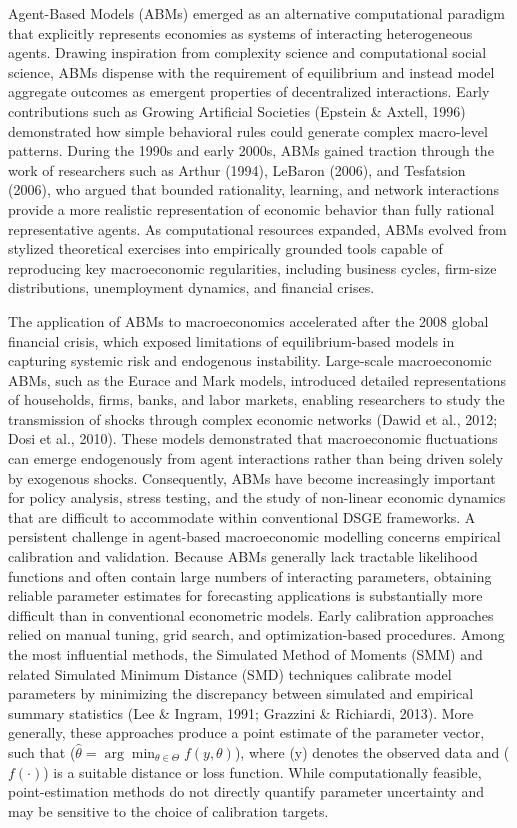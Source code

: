 \documentclass[12pt]{article}
\begin{document}
Agent-Based Models (ABMs) emerged as an alternative computational paradigm that explicitly represents economies as systems of interacting heterogeneous agents. Drawing inspiration from complexity science and computational social science, ABMs dispense with the requirement of equilibrium and instead model aggregate outcomes as emergent properties of decentralized interactions. Early contributions such as Growing Artificial Societies (Epstein \& Axtell, 1996) demonstrated how simple behavioral rules could generate complex macro-level patterns. During the 1990s and early 2000s, ABMs gained traction through the work of researchers such as Arthur (1994), LeBaron (2006), and Tesfatsion (2006), who argued that bounded rationality, learning, and network interactions provide a more realistic representation of economic behavior than fully rational representative agents. As computational resources expanded, ABMs evolved from stylized theoretical exercises into empirically grounded tools capable of reproducing key macroeconomic regularities, including business cycles, firm-size distributions, unemployment dynamics, and financial crises.

The application of ABMs to macroeconomics accelerated after the 2008 global financial crisis, which exposed limitations of equilibrium-based models in capturing systemic risk and endogenous instability. Large-scale macroeconomic ABMs, such as the Eurace and Mark models, introduced detailed representations of households, firms, banks, and labor markets, enabling researchers to study the transmission of shocks through complex economic networks (Dawid et al., 2012; Dosi et al., 2010). These models demonstrated that macroeconomic fluctuations can emerge endogenously from agent interactions rather than being driven solely by exogenous shocks. Consequently, ABMs have become increasingly important for policy analysis, stress testing, and the study of non-linear economic dynamics that are difficult to accommodate within conventional DSGE frameworks.
A persistent challenge in agent-based macroeconomic modelling concerns empirical calibration and validation. Because ABMs generally lack tractable likelihood functions and often contain large numbers of interacting parameters, obtaining reliable parameter estimates for forecasting applications is substantially more difficult than in conventional econometric models. Early calibration approaches relied on manual tuning, grid search, and optimization-based procedures. Among the most influential methods, the Simulated Method of Moments (SMM) and related Simulated Minimum Distance (SMD) techniques calibrate model parameters by minimizing the discrepancy between simulated and empirical summary statistics (Lee \& Ingram, 1991; Grazzini \& Richiardi, 2013). More generally, these approaches produce a point estimate of the parameter vector, such that ($\hat{\theta} = \arg\min_{\theta \in \Theta} f(y,\theta)$), where (y) denotes the observed data and ($f(\cdot)$) is a suitable distance or loss function. While computationally feasible, point-estimation methods do not directly quantify parameter uncertainty and may be sensitive to the choice of calibration targets.
\end{document}
